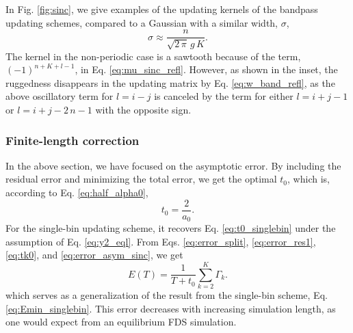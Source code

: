 \documentclass[reprint, superscriptaddress, floatfix]{revtex4-1}
\newcommand{\Err}{E}
\begin{document}
In Fig. \ref{fig:sinc},
we give examples of the updating kernels
of the bandpass updating schemes,
compared to a Gaussian
with a similar width, $\sigma$,
%
\begin{equation}
  \sigma
  \approx
  \frac
  {
    n
  }
  {
    \sqrt{ 2 \, \pi } \, g \, K
  }
  .
\label{eq:sigma_equiv}
\end{equation}
%
%
The kernel in the non-periodic case is a sawtooth
because of the term, $(-1)^{n+K+l-1}$,
in Eq. \eqref{eq:mu_sinc_refl}.
%
However, as shown in the inset, %
the ruggedness disappears
in the updating matrix by Eq. \eqref{eq:w_band_refl},
as the above oscillatory term for $l = i - j$
is canceled by the term for either $l = i + j - 1$
or $l = i + j - 2 \, n - 1$
with the opposite sign.



\subsubsection{\label{sec:finlencorr}
Finite-length correction}



In the above section,
we have focused on
the asymptotic error.
%
By including the residual error
and minimizing the total error,
we get the optimal $t_0$,
which is, according to Eq. \eqref{eq:half_alpha0},
%
%
\begin{equation}
  t_0
  =
  \frac{  2  }
       { a_0 }
  .
\label{eq:t0_sinc}
\end{equation}
%
For the single-bin updating scheme,
it recovers Eq. \eqref{eq:t0_singlebin}
under the assumption of Eq. \eqref{eq:y2_eql}.
%
From Eqs. \eqref{eq:error_split},
\eqref{eq:error_res1},
\eqref{eq:tk0},
and
\eqref{eq:error_asym_sinc},
we get
%
\begin{equation}
  \Err(T)
  =
  \frac{   1     }
       { T + t_0 }
  \sum_{ k = 2 }^K
    \Gamma_k
  .
\label{eq:error_sinc}
\end{equation}
%
which serves as a generalization of
the result from the single-bin scheme, Eq. \eqref{eq:Emin_singlebin}.
%
This error decreases with increasing simulation length,
as one would expect from an equilibrium FDS simulation.
\end{document}
